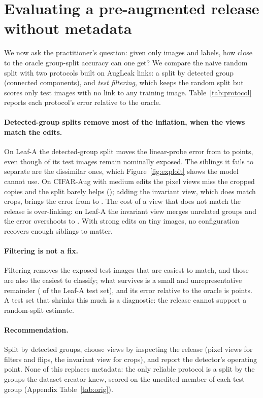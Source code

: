\section{Evaluating a pre-augmented release without metadata}
\label{sec:protocol}

We now ask the practitioner's question: given only images and labels, how close to the oracle group-split accuracy can one get? We compare the naive random split with two protocols built on AugLeak links: a split by detected group (connected components), and \emph{test filtering}, which keeps the random split but scores only test images with no link to any training image. Table~\ref{tab:protocol} reports each protocol's error relative to the oracle.



\paragraph{Detected-group splits remove most of the inflation, when the views match the edits.}
On Leaf-A the detected-group split moves the linear-probe error from \numProtLeafAnaiveErr{} to \numProtLeafAdgroupErr{} points, even though \numProtLeafAdgroupExp{} of its test images remain nominally exposed. The siblings it fails to separate are the dissimilar ones, which Figure~\ref{fig:exploit} shows the model cannot use. On CIFAR-Aug with medium edits the pixel views miss the cropped copies and the split barely helps (\numProtCmediumdgroupErr{}); adding the invariant view, which does match crops, brings the error from \numProtCmediumnaiveErr{} to \numProtCmediumInvdgroupErr{}. The cost of a view that does not match the release is over-linking: on Leaf-A the invariant view merges unrelated groups and the error overshoots to \numProtLeafAInvdgroupErr{}. With strong edits on tiny images, no configuration recovers enough siblings to matter.

\paragraph{Filtering is not a fix.}
Filtering removes the exposed test images that are easiest to match, and those are also the easiest to classify; what survives is a small and unrepresentative remainder (\numProtLeafAfilterKept{} of the Leaf-A test set), and its error relative to the oracle is \numProtLeafAfilterErr{} points. A test set that shrinks this much is a diagnostic: the release cannot support a random-split estimate.

\paragraph{Recommendation.}
Split by detected groups, choose views by inspecting the release (pixel views for filters and flips, the invariant view for crops), and report the detector's operating point. None of this replaces metadata: the only reliable protocol is a split by the groups the dataset creator knew, scored on the unedited member of each test group (Appendix Table~\ref{tab:orig}).

